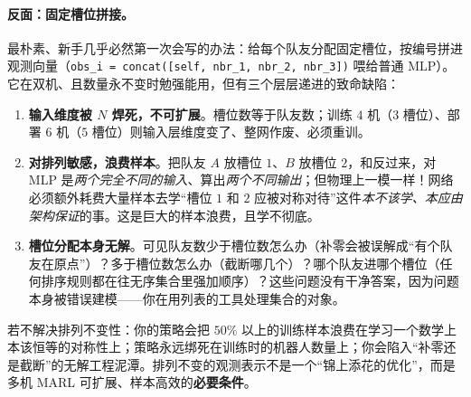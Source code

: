 \paragraph{反面：固定槽位拼接。}
最朴素、新手几乎必然第一次会写的办法：给每个队友分配固定槽位，按编号拼进观测向量（\verb|obs_i = concat([self, nbr_1, nbr_2, nbr_3])| 喂给普通 MLP）。它在双机、且数量永不变时勉强能用，但有三个层层递进的致命缺陷：

\begin{enumerate}
  \item \textbf{输入维度被 $N$ 焊死，不可扩展}。槽位数等于队友数；训练 $4$ 机（$3$ 槽位）、部署 $6$ 机（$5$ 槽位）则输入层维度变了、整网作废、必须重训。
  \item \textbf{对排列敏感，浪费样本}。把队友 $A$ 放槽位 $1$、$B$ 放槽位 $2$，和反过来，对 MLP 是\emph{两个完全不同的输入}、算出\emph{两个不同输出}；但物理上一模一样！网络必须额外耗费大量样本去学“槽位 $1$ 和 $2$ 应被对称对待”这件\emph{本不该学、本应由架构保证}的事。这是巨大的样本浪费，且学不彻底。
  \item \textbf{槽位分配本身无解}。可见队友数少于槽位数怎么办（补零会被误解成“有个队友在原点”）？多于槽位数怎么办（截断哪几个）？哪个队友进哪个槽位（任何排序规则都在往无序集合里强加顺序）？这些问题没有干净答案，因为问题本身被错误建模——你在用列表的工具处理集合的对象。
\end{enumerate}

\begin{insight}
若不解决排列不变性：你的策略会把 $50\%$ 以上的训练样本浪费在学习一个数学上本该恒等的对称性上；策略永远绑死在训练时的机器人数量上；你会陷入“补零还是截断”的无解工程泥潭。排列不变的观测表示不是一个“锦上添花的优化”，而是多机 MARL 可扩展、样本高效的\textbf{必要条件}。
\end{insight}

